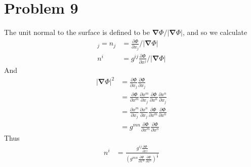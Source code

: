 \documentclass[12pt]{article}
\newcommand{\eq}[1]{\begin{align*}#1\end{align*}}
\newcommand{\p}[2]{\frac{\partial#1}{\partial#2}}
\newcommand{\n}{\bm{\nabla}}
\begin{document}
\section*{Problem 9} The unit normal to the surface is defined to be $\n\Phi / |\n\Phi|$, and so we calculate
\eq{
	[\n\Phi / |\n\Phi|]_j = n_j &= \p{\Phi}{x_j} / |\n\Phi|\\
	n^i &= g^{ij} \p{\Phi}{x^j} / |\n\Phi|
}
And
\eq{
	|\n\Phi|^2 &= \p{\Phi}{x_j}\p{\Phi}{x_j}\\
	&= \p{\Phi}{x^m}\p{x^m}{x_j}\p{\Phi}{x^n}\p{x^n}{x_j}\\
	&= \p{x^m}{x_j}\p{x^n}{x_j}\p{\Phi}{x^m}\p{\Phi}{x^n}\\
	&= g^{mn}\p{\Phi}{x^m}\p{\Phi}{x^n}
}
Thus
\eq{
	n^i &= \frac{g^{ij}\p{\Phi}{x^j}}{\left( g^{mn}\p{\Phi}{x^m}\p{\Phi}{x^n} \right)^\frac{1}{2}}
}
\end{document}
